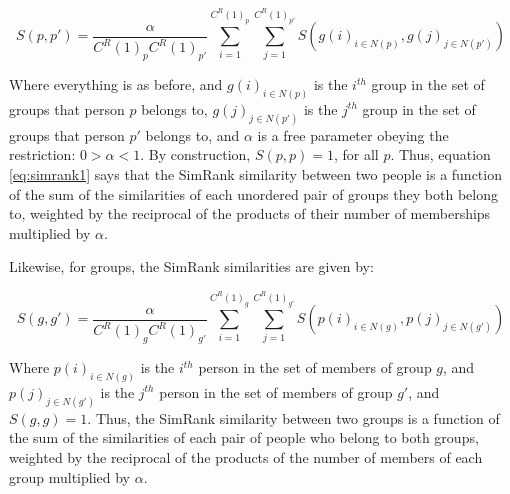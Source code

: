 \documentclass[a4paper,fleqn]{cas-sc}
\begin{document}
\begin{equation}
    S(p, p') = \frac{\alpha}{C^R(1)_pC^R(1)_{p'}}
    \sum_{i = 1}^{C^R(1)_p} \sum_{j = 1}^{C^R(1)_{p'}} 
    S\left(g(i)_{i \in N(p)}, g(j)_{j \in N(p')}\right)
    \label{eq:simrank1}
\end{equation}

Where everything is as before, and $g(i)_{i \in N(p)}$ is the $i^{th}$ group in the set of groups that person $p$ belongs to, $g(j)_{j \in N(p')}$ is the $j^{th}$ group in the set of groups that person $p'$ belongs to, and $\alpha$ is a free parameter obeying the restriction: $0 > \alpha < 1$. By construction, $S(p, p) = 1$, for all $p$. Thus, equation \ref{eq:simrank1} says that the SimRank similarity between two people is a function of the sum of the similarities of each unordered pair of groups they both belong to, weighted by the reciprocal of the products of their number of memberships multiplied by $\alpha$.

Likewise, for groups, the SimRank similarities are given by:

\begin{equation}
    S(g, g') = \frac{\alpha}{C^R(1)_gC^R(1)_{g'}}
    \sum_{i = 1}^{C^R(1)_g} \sum_{j = 1}^{C^R(1)_{g'}} 
    S\left(p(i)_{i \in N(g)}, p(j)_{j \in N(g')}\right)
    \label{eq:simrank2}
\end{equation}

Where $p(i)_{i \in N(g)}$ is the $i^{th}$ person in the set of members of group $g$, and $p(j)_{j \in N(g')}$ is the $j^{th}$ person in the set of members of group $g'$, and $S(g, g) = 1$. Thus, the SimRank similarity between two groups is a function of the sum of the similarities of each pair of people who belong to both groups, weighted by the reciprocal of the products of the number of members of each group multiplied by $\alpha$.
\end{document}
